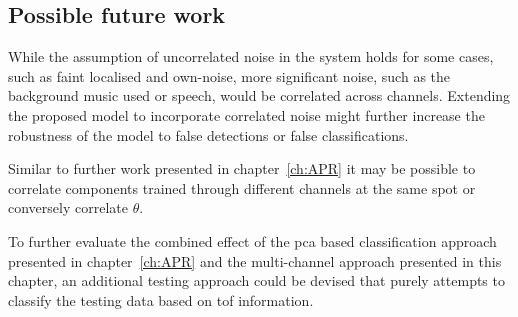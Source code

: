 \subsection{Possible future work}
While the assumption of uncorrelated noise in the system holds for some cases, such as faint localised and own-noise, more significant noise, such as the background music used or speech, would be correlated across channels. Extending the proposed model to incorporate correlated noise might further increase the robustness of the model to false detections or false classifications.

Similar to further work presented in chapter~\ref{ch:APR} it may be possible to correlate components trained through different channels at the same spot or conversely correlate $\theta$.



To further evaluate the combined effect of the \gls{pca} based classification approach presented in chapter~\ref{ch:APR} and the multi-channel approach presented in this chapter, an additional testing approach could be devised that purely attempts to classify the testing data based on \gls{tof} information.



